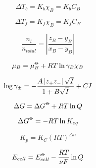 \documentclass[12pt, letterpaper]{memoir}
\begin{document}
\noindent
\begin{minipage}[t]{0.5\linewidth}
	\begin{equation*}
		\Delta T_b=K_b\chi_B = K_bC_B
	\end{equation*}
	
	\begin{equation*}
		\Delta T_f=K_f\chi_B=K_fC_B
	\end{equation*}
	
	\begin{equation*}
		\frac{n_l}{n_{total}}=\left|\frac{z_B-y_B}{x_B-y_B}\right|
	\end{equation*}
	
	\begin{equation*}
		\mu_B=\mu^{\std}_B+RT\ln\gamma_B\chi_B
	\end{equation*}
	
	\begin{equation*}
		\log\gamma_\pm = -\frac{A\left| z_+z_- \right|\sqrt{I}}{1+B\sqrt{I}} + CI
	\end{equation*}
	
	\begin{equation*}
		\Delta G = \Delta G^{\std} +RT\ln Q
	\end{equation*}
	
	\begin{equation*}
		\Delta G^{\std}=-RT\ln K_{eq}
	\end{equation*}
	
	\begin{equation*}
		K_p=K_C\left(RT\right)^{\Delta n}
	\end{equation*}
	
	\begin{equation*}
		E_{cell}=E^{\std}_{cell}-\frac{RT}{\nu F}\ln Q
	\end{equation*}	
\end{minipage}
\end{document}
